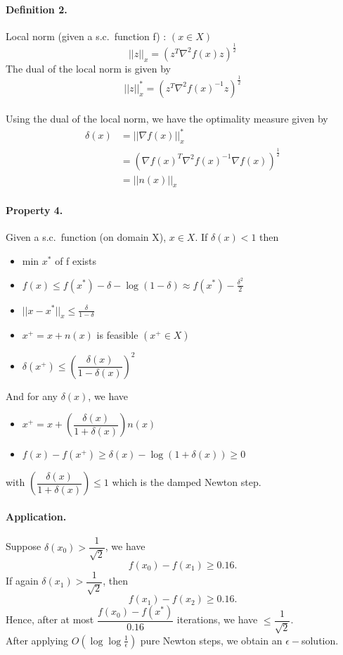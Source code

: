 \documentclass[a4paper,11pt]{article}
\begin{document}
\paragraph{Definition 2.} Local norm (given a s.c.\ function f) : $(x \in X)$ 
$$
||z||_x  = (z^T \nabla^2f(x)z)^{\frac{1}{2}}
$$
The dual of the local norm is given by
$$
||z||^*_x  = (z^T \nabla^2f(x)^{-1}z)^{\frac{1}{2}}
$$
\\
Using the dual of the local norm, we have the optimality measure given by
\begin{align*}
\delta(x) &= ||\nabla f(x)||^*_x \\
& = (\nabla f(x)^T \nabla^2f(x)^{-1}\nabla f(x))^{\frac{1}{2}} \\
&= ||n(x)||_x
\end{align*}

\paragraph{Property 4.} Given a s.c.\ function (on domain X), $x\in X$. If $\delta(x) < 1$ then 
\begin{itemize}
\item min $x^*$ of f exists
\item $f(x) \leq f(x^*) - \delta - \log{(1-\delta)} \approx f(x^*) - \frac{\delta^2}{2}$
\item $||x-x^*||_x \leq \frac{\delta}{1 - \delta} $
\item $x^+ = x + n(x)$ is feasible $(x^+ \in X)$
\item $\delta(x^+) \leq \left(\dfrac{\delta(x)}{1-\delta(x)}\right)^2 $\\
\end{itemize}
And for any $\delta(x)$, we have 
\begin{itemize}
\item $x^+ = x + \left(\dfrac{\delta(x)}{1+\delta(x)}\right)n(x) $
\item $f(x) - f(x^+) \geq \delta(x) - \log{(1+\delta(x))} \geq 0 $
\end{itemize}
with $\left(\dfrac{\delta(x)}{1+\delta(x)}\right) \le 1$ which is the damped Newton step.

\paragraph{Application.} Suppose $\delta(x_0) > \dfrac{1}{\sqrt{2}}$, we have $$f(x_0) - f(x_1) \geq 0.16.$$ 
If again $\delta(x_1) > \dfrac{1}{\sqrt{2}}$, then $$f(x_1) - f(x_2) \geq 0.16.$$ Hence, after at most $\dfrac{f(x_0) - f(x^*)}{0.16}$ iterations, we have $\leq \dfrac{1}{\sqrt{2}}$. \\
After applying $O(\log{\log{\frac{1}{\epsilon}}})$ pure Newton steps, we obtain an $\epsilon-$solution.
\end{document}

